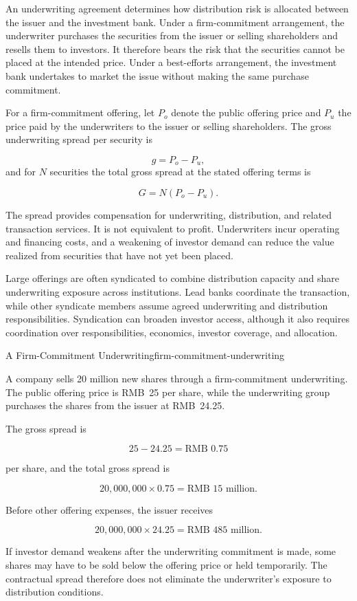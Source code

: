 An underwriting agreement determines how distribution risk is allocated between the issuer and the investment bank. Under a firm-commitment arrangement, the underwriter purchases the securities from the issuer or selling shareholders and resells them to investors. It therefore bears the risk that the securities cannot be placed at the intended price. Under a best-efforts arrangement, the investment bank undertakes to market the issue without making the same purchase commitment.

For a firm-commitment offering, let $P_o$ denote the public offering price and $P_u$ the price paid by the underwriters to the issuer or selling shareholders. The gross underwriting spread per security is

\begin{equation}
g=P_o-P_u,
\label{eq:ch13-underwriting-spread}
\end{equation}
and for $N$ securities the total gross spread at the stated offering terms is

\begin{equation}
G=N(P_o-P_u).
\label{eq:ch13-total-underwriting-spread}
\end{equation}

The spread provides compensation for underwriting, distribution, and related transaction services. It is not equivalent to profit. Underwriters incur operating and financing costs, and a weakening of investor demand can reduce the value realized from securities that have not yet been placed.

Large offerings are often syndicated to combine distribution capacity and share underwriting exposure across institutions. Lead banks coordinate the transaction, while other syndicate members assume agreed underwriting and distribution responsibilities. Syndication can broaden investor access, although it also requires coordination over responsibilities, economics, investor coverage, and allocation.

\begin{example}{A Firm-Commitment Underwriting}{firm-commitment-underwriting}

A company sells 20 million new shares through a firm-commitment underwriting. The public offering price is RMB~25 per share, while the underwriting group purchases the shares from the issuer at RMB~24.25.

The gross spread is

\[
25-24.25=\text{RMB }0.75
\]

per share, and the total gross spread is

\[
20{,}000{,}000\times0.75=\text{RMB }15\text{ million}.
\]

Before other offering expenses, the issuer receives

\[
20{,}000{,}000\times24.25=\text{RMB }485\text{ million}.
\]

If investor demand weakens after the underwriting commitment is made, some shares may have to be sold below the offering price or held temporarily. The contractual spread therefore does not eliminate the underwriter's exposure to distribution conditions.

\end{example}


